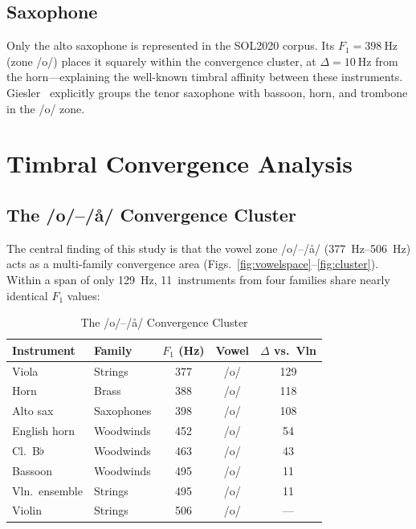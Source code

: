\documentclass[journal]{IEEEtran}
\newcommand{\Fn}[1]{F_{#1}}
\begin{document}
\subsection{Saxophone}

Only the alto saxophone is represented in the SOL2020 corpus. Its $\Fn{1} = \SI{398}{\hertz}$ (zone /o/) places it squarely within the convergence cluster, at $\Delta = \SI{10}{\hertz}$ from the horn---explaining the well-known timbral affinity between these instruments. Giesler~\cite{giesler1985} explicitly groups the tenor saxophone with bassoon, horn, and trombone in the /o/ zone.

\section{Timbral Convergence Analysis}
\label{sec:convergence}

\subsection{The /o/--/\aa/ Convergence Cluster}

The central finding of this study is that the vowel zone /o/--/\aa/ (\SIrange{377}{506}{\hertz}) acts as a multi-family convergence area (Figs.~\ref{fig:vowelspace}--\ref{fig:cluster}). Within a span of only \SI{129}{\hertz}, 11~instruments from four families share nearly identical $\Fn{1}$ values:

\begin{table}[!t]
\centering
\caption{The /o/--/\aa/ Convergence Cluster}
\label{tab:cluster}
\begin{tabular}{@{}llS[table-format=3.0]cS[table-format=3.0]@{}}
\toprule
Instrument & Family & {$\Fn{1}$ (Hz)} & Vowel & {$\Delta$ vs.\ Vln} \\
\midrule
Viola             & Strings    & 377 & /o/ & 129 \\
Horn              & Brass      & 388 & /o/ & 118 \\
Alto sax          & Saxophones & 398 & /o/ & 108 \\
English horn      & Woodwinds  & 452 & /o/ & 54 \\
Cl.\ B$\flat$     & Woodwinds  & 463 & /o/ & 43 \\
Bassoon           & Woodwinds  & 495 & /o/ & 11 \\
Vln.\ ensemble    & Strings    & 495 & /o/ & 11 \\
Violin            & Strings    & 506 & /o/ & {---} \\
\bottomrule
\end{tabular}
\end{table}
\end{document}
